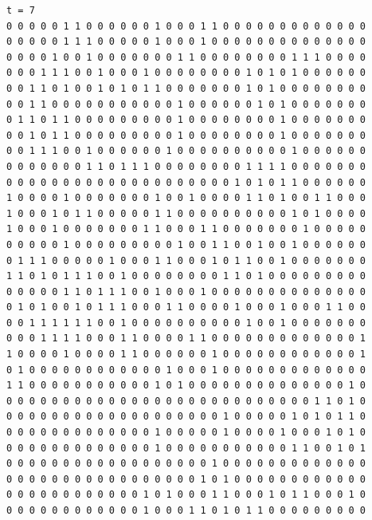 \documentclass[a4paper,12pt]{article}
\begin{document}
\begin{verbatim}
t = 7
0 0 0 0 0 1 1 0 0 0 0 0 0 1 0 0 0 1 1 0 0 0 0 0 0 0 0 0 0 0 0 0 
0 0 0 0 0 1 1 1 0 0 0 0 0 1 0 0 0 1 0 0 0 0 0 0 0 0 0 0 0 0 0 0 
0 0 0 0 1 0 0 1 0 0 0 0 0 0 0 1 1 0 0 0 0 0 0 0 0 1 1 1 0 0 0 0 
0 0 0 1 1 1 0 0 1 0 0 0 1 0 0 0 0 0 0 0 0 1 0 1 0 1 0 0 0 0 0 0 
0 0 1 1 0 1 0 0 1 0 1 0 1 1 0 0 0 0 0 0 0 1 0 1 0 0 0 0 0 0 0 0 
0 0 1 1 0 0 0 0 0 0 0 0 0 0 0 1 0 0 0 0 0 0 1 0 1 0 0 0 0 0 0 0 
0 1 1 0 1 1 0 0 0 0 0 0 0 0 0 1 0 0 0 0 0 0 0 0 1 0 0 0 0 0 0 0 
0 0 1 0 1 1 0 0 0 0 0 0 0 0 0 1 0 0 0 0 0 0 0 0 1 0 0 0 0 0 0 0 
0 0 1 1 1 0 0 1 0 0 0 0 0 0 1 0 0 0 0 0 0 0 0 0 0 1 0 0 0 0 0 0 
0 0 0 0 0 0 0 1 1 0 1 1 1 0 0 0 0 0 0 0 0 1 1 1 1 0 0 0 0 0 0 0 
0 0 0 0 0 0 0 0 0 0 0 0 0 0 0 0 0 0 0 0 1 0 1 0 1 1 0 0 0 0 0 0 
1 0 0 0 0 1 0 0 0 0 0 0 0 1 0 0 1 0 0 0 0 1 1 0 1 0 0 1 1 0 0 0 
1 0 0 0 1 0 1 1 0 0 0 0 0 1 1 0 0 0 0 0 0 0 0 0 0 1 0 1 0 0 0 0 
1 0 0 0 1 0 0 0 0 0 0 0 1 1 0 0 0 1 1 0 0 0 0 0 0 0 1 0 0 0 0 0 
0 0 0 0 0 1 0 0 0 0 0 0 0 0 0 1 0 0 1 1 0 0 1 0 0 1 0 0 0 0 0 0 
0 1 1 1 0 0 0 0 0 1 0 0 0 1 1 0 0 0 1 0 1 1 0 0 1 0 0 0 0 0 0 0 
1 1 0 1 0 1 1 1 0 0 1 0 0 0 0 0 0 0 0 1 1 0 1 0 0 0 0 0 0 0 0 0 
0 0 0 0 0 1 1 0 1 1 1 0 0 1 0 0 0 1 0 0 0 0 0 0 0 0 0 0 0 0 0 0 
0 1 0 1 0 0 1 0 1 1 1 0 0 0 1 1 0 0 0 0 1 0 0 0 1 0 0 0 1 1 0 0 
0 0 1 1 1 1 1 1 0 0 1 0 0 0 0 0 0 0 0 0 0 1 0 0 1 0 0 0 0 0 0 0 
0 0 0 1 1 1 1 0 0 0 1 1 0 0 0 0 1 1 0 0 0 0 0 0 0 0 0 0 0 0 0 1 
1 0 0 0 0 1 0 0 0 0 1 1 0 0 0 0 0 0 1 0 0 0 0 0 0 0 0 0 0 0 0 1 
0 1 0 0 0 0 0 0 0 0 0 0 0 0 1 0 0 0 1 0 0 0 0 0 0 0 0 0 0 0 0 0 
1 1 0 0 0 0 0 0 0 0 0 0 0 1 0 1 0 0 0 0 0 0 0 0 0 0 0 0 0 0 1 0 
0 0 0 0 0 0 0 0 0 0 0 0 0 0 0 0 0 0 0 0 0 0 0 0 0 0 0 1 1 0 1 0 
0 0 0 0 0 0 0 0 0 0 0 0 0 0 0 0 0 0 0 1 0 0 0 0 0 1 0 1 0 1 1 0 
0 0 0 0 0 0 0 0 0 0 0 0 0 1 0 0 0 0 0 1 0 0 0 0 1 0 0 0 1 0 1 0 
0 0 0 0 0 0 0 0 0 0 0 0 0 1 0 0 0 0 0 0 0 0 0 0 0 1 1 0 0 1 0 1 
0 0 0 0 0 0 0 0 0 0 0 0 0 0 0 0 0 0 1 0 0 0 0 0 0 0 0 0 0 0 0 0 
0 0 0 0 0 0 0 0 0 0 0 0 0 0 0 0 0 1 0 1 0 0 0 0 0 0 0 0 0 0 0 0 
0 0 0 0 0 0 0 0 0 0 0 0 1 0 1 0 0 0 1 1 0 0 0 1 0 1 1 0 0 0 1 0 
0 0 0 0 0 0 0 0 0 0 0 0 1 0 0 0 1 1 0 1 0 1 1 0 0 0 0 0 0 0 0 0 




\end{verbatim}
\end{document}
